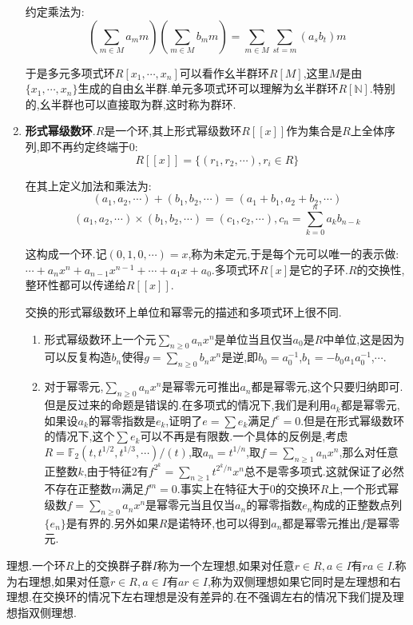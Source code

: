 \begin{enumerate}
	约定乘法为:
	$$\left(\sum_{m\in M}a_mm\right)\left(\sum_{m\in M}b_mm\right)=\sum_{m\in M}\sum_{st=m}(a_sb_t)m$$
	
	于是多元多项式环$R[x_1,\cdots,x_n]$可以看作幺半群环$R[M]$,这里$M$是由$\{x_1,\cdots,x_n\}$生成的自由幺半群.单元多项式环可以理解为幺半群环$R[\mathbb{N}]$.特别的,幺半群也可以直接取为群,这时称为群环.
	\item \textbf{形式幂级数环}.$R$是一个环,其上形式幂级数环$R[[x]]$作为集合是$R$上全体序列,即不再约定终端于0:
	$$R[[x]]=\{(r_1,r_2,\cdots),r_i\in R\}$$
	
	在其上定义加法和乘法为:
	$$(a_1,a_2,\cdots)+(b_1,b_2,\cdots)=(a_1+b_1,a_2+b_2,\cdots)$$
	$$(a_1,a_2,\cdots)\times(b_1,b_2,\cdots)=(c_1,c_2,\cdots),c_n=\sum_{k=0}^n a_kb_{n-k}$$
	
	这构成一个环.记$(0,1,0,\cdots)=x$,称为未定元,于是每个元可以唯一的表示做:$\cdots+a_nx^n+a_{n-1}x^{n-1}+\cdots+a_1x+a_0$.多项式环$R[x]$是它的子环.$R$的交换性,整环性都可以传递给$R[[x]]$.
	
	交换的形式幂级数环上单位和幂零元的描述和多项式环上很不同.
	\begin{enumerate}
		\item 形式幂级数环上一个元$\sum_{n\ge0}a_nx^n$是单位当且仅当$a_0$是$R$中单位,这是因为可以反复构造$b_n$使得$g=\sum_{n\ge0}b_nx^n$是逆,即$b_0=a_0^{-1}$,$b_1=-b_0a_1a_0^{-1}$,$\cdots$.
		
		\item 对于幂零元,$\sum_{n\ge0}a_nx^n$是幂零元可推出$a_n$都是幂零元,这个只要归纳即可.但是反过来的命题是错误的.在多项式的情况下,我们是利用$a_k$都是幂零元,如果设$a_k$的幂零指数是$e_k$,证明了$e=\sum e_k$满足$f^e=0$.但是在形式幂级数环的情况下,这个$\sum e_k$可以不再是有限数.一个具体的反例是,考虑$R=\mathbb{F}_2(t,t^{1/2},t^{1/3},\cdots)/(t)$,取$a_n=t^{1/n}$,取$f=\sum_{n\ge1}a_nx^n$,那么对任意正整数$k$,由于特征2有$f^{2^k}=\sum_{n\ge1}t^{2^k/n}x^n$总不是零多项式.这就保证了必然不存在正整数$m$满足$f^m=0$.事实上在特征大于0的交换环$R$上,一个形式幂级数$f=\sum_{n\ge0}a_nx^n$是幂零元当且仅当$a_n$的幂零指数$e_n$构成的正整数点列$\{e_n\}$是有界的.另外如果$R$是诺特环,也可以得到$a_n$都是幂零元推出$f$是幂零元.
	\end{enumerate}
\end{enumerate}

理想.一个环$R$上的交换群子群$I$称为一个左理想,如果对任意$r\in R,a\in I$有$ra\in I$.称为右理想,如果对任意$r\in R,a\in I$有$ar\in I$,称为双侧理想如果它同时是左理想和右理想.在交换环的情况下左右理想是没有差异的.在不强调左右的情况下我们提及理想指双侧理想.

